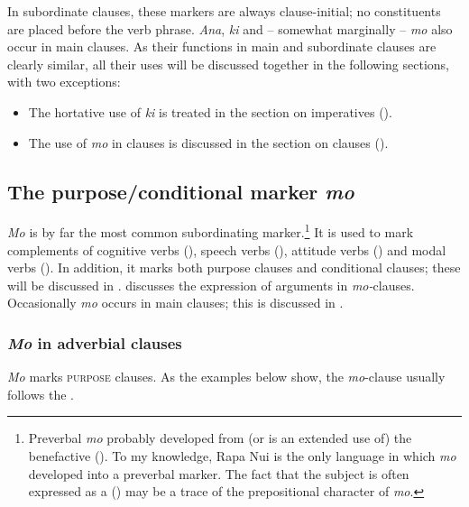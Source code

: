 In subordinate clauses, these markers are always clause-initial; no constituents are placed before the verb phrase. \textit{Ana}, \textit{ki} and – somewhat marginally – \textit{mo} also occur in main clauses. As their functions in main and subordinate clauses are clearly similar, all their uses will be discussed together in the following sections, with two exceptions:

\begin{itemize}
\item 
The hortative use of \textit{ki} is treated in the section on imperatives ().

\item 
The use of \textit{mo} in  clauses is discussed in the section on  clauses ().

\end{itemize}
\subsection{The purpose/conditional marker \textit{mo}}\label{sec:11.5.1}
\textit{Mo} is by far the most common subordinating marker.\footnote{\label{fn:520}Preverbal \textit{mo} probably developed from (or is an extended use of) the benefactive  (). To my knowledge, Rapa Nui is the only language in which \textit{mo} developed into a preverbal marker. The fact that the subject is often expressed as a  () may be a trace of the prepositional character of \textit{mo}.} It is used to mark complements of cognitive verbs (), speech verbs (), attitude verbs () and modal verbs (). In addition, it marks both purpose clauses and conditional clauses; these will be discussed in .  discusses the expression of arguments in \textit{mo-}clauses. Occasionally \textit{mo} occurs in main clauses; this is discussed in .

\subsubsection{\textit{Mo} in adverbial clauses}\label{sec:11.5.1.1}

\textit{Mo} marks \textsc{purpose} clauses. As the examples below show, the \textit{mo}{}-clause usually follows the . 

